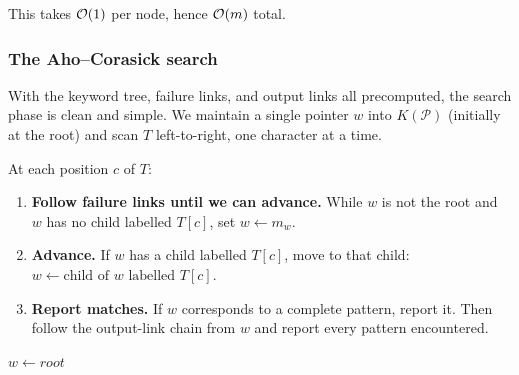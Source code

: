 This takes $\mathcal{O}\!\left(1\right)$ per node, hence $\mathcal{O}\!\left(m\right)$ total.

\begin{algorithm}[H]
  \caption{Compute output links (extends Algorithm~\ref{alg:ac-failure})}
  \label{alg:ac-output}
\end{algorithm}


\subsubsection{The Aho--Corasick search}

With the keyword tree, failure links, and output links all precomputed,
the search phase is clean and simple.
We maintain a single pointer $w$ into $K(\mathcal{P})$ (initially at
the root) and scan $T$ left-to-right, one character at a time.

At each position $c$ of $T$:
\begin{enumerate}[nosep]
  \item \textbf{Follow failure links until we can advance.}
        While $w$ is not the root and $w$ has no child labelled $T[c]$,
        set $w \gets m_w$.
  \item \textbf{Advance.}
        If $w$ has a child labelled $T[c]$, move to that child:
        $w \gets \text{child of } w \text{ labelled } T[c]$.
  \item \textbf{Report matches.}
        If $w$ corresponds to a complete pattern, report it.
        Then follow the output-link chain from $w$ and report every
        pattern encountered.
\end{enumerate}

\begin{algorithm}[H]
  \caption{Aho--Corasick search}
  \label{alg:ac-search}
  $w \gets root$\;
\end{algorithm}

